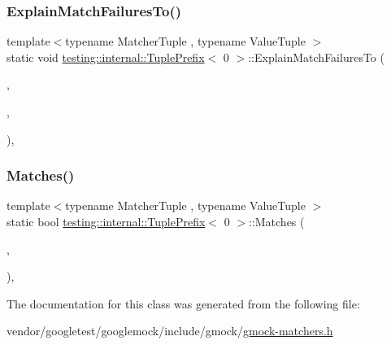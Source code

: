 \subsubsection{\texorpdfstring{Explain\+Match\+Failures\+To()}{ExplainMatchFailuresTo()}}
{\footnotesize\ttfamily template$<$typename Matcher\+Tuple , typename Value\+Tuple $>$ \\
static void \hyperlink{classtesting_1_1internal_1_1_tuple_prefix}{testing\+::internal\+::\+Tuple\+Prefix}$<$ 0 $>$\+::Explain\+Match\+Failures\+To (\begin{DoxyParamCaption}\item[{const \hyperlink{structtesting_1_1internal_1_1_matcher_tuple}{Matcher\+Tuple} \&}]{,  }\item[{const Value\+Tuple \&}]{,  }\item[{\+::std\+::ostream $\ast$}]{ }\end{DoxyParamCaption})\hspace{0.3cm}{\ttfamily [inline]}, {\ttfamily [static]}}

\mbox{\label{classtesting_1_1internal_1_1_tuple_prefix_3_010_01_4_a8bb323da9f209f4fef5d81d7c0b628e9}} 
\subsubsection{\texorpdfstring{Matches()}{Matches()}}
{\footnotesize\ttfamily template$<$typename Matcher\+Tuple , typename Value\+Tuple $>$ \\
static bool \hyperlink{classtesting_1_1internal_1_1_tuple_prefix}{testing\+::internal\+::\+Tuple\+Prefix}$<$ 0 $>$\+::Matches (\begin{DoxyParamCaption}\item[{const \hyperlink{structtesting_1_1internal_1_1_matcher_tuple}{Matcher\+Tuple} \&}]{,  }\item[{const Value\+Tuple \&}]{ }\end{DoxyParamCaption})\hspace{0.3cm}{\ttfamily [inline]}, {\ttfamily [static]}}



The documentation for this class was generated from the following file\+:\begin{DoxyCompactItemize}
\item 
vendor/googletest/googlemock/include/gmock/\hyperlink{gmock-matchers_8h}{gmock-\/matchers.\+h}\end{DoxyCompactItemize}
